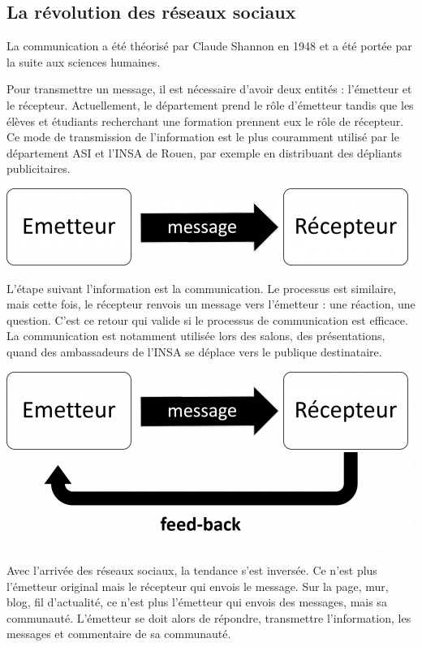 \subsection{La révolution des réseaux sociaux}
La communication a été théorisé par Claude Shannon en 1948 et a été portée par la suite aux sciences humaines.

Pour transmettre un message, il est nécessaire d'avoir deux entités : l'émetteur et le récepteur. Actuellement, le département prend le rôle d'émetteur tandis que les élèves et étudiants recherchant une formation prennent eux le rôle de récepteur. Ce mode de transmission de l'information est le plus couramment utilisé par le département ASI et l'INSA de Rouen, par exemple en distribuant des dépliants publicitaires.

\begin{center}
\includegraphics[scale=0.5]{./image/information.png}
\end{center}

L'étape suivant l'information est la communication. Le processus est similaire, mais cette fois, le récepteur renvois un message vers l'émetteur : une réaction, une question. C'est ce retour qui valide si le processus de communication est efficace. La communication est notamment utilisée lors des salons, des présentations, quand des ambassadeurs de l'INSA se déplace vers le publique destinataire.

\begin{center}
\includegraphics[scale=0.5]{./image/communication.png}
\end{center}

Avec l'arrivée des réseaux sociaux, la tendance s'est inversée. Ce n'est plus l'émetteur original mais le récepteur qui envois le message. Sur la page, mur, blog, fil d'actualité, ce n'est plus l'émetteur qui envois des messages, mais sa communauté. L'émetteur se doit alors de répondre, transmettre l'information, les messages et commentaire de sa communauté.

